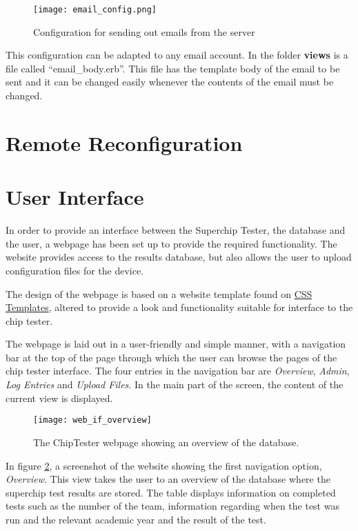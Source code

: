 \begin{figure}[htb]
\centering
\texttt{[image: email\_config.png]}
\caption{Configuration for sending out emails from the server}
\label{fig:email_server}
\end{figure}

This configuration can be adapted to any email account. In the folder {\bf views} is a file called ``email\_body.erb''. This file has the template body of the email to be sent and it can be changed easily whenever the contents of the email must be changed.

\section{Remote Reconfiguration}

\section{User Interface}

In order to provide an interface between the Superchip Tester, the database and the user, a webpage has been set up to provide the required functionality. The website provides access to the results database, but also allows the user to upload configuration files for the device.

The design of the webpage is based on a website template found on \href{http://www.freecsstemplates.org/}{CSS Templates}, altered to provide a look and functionality suitable for interface to the chip tester.

The webpage is laid out in a user-friendly and simple manner, with a navigation bar at the top of the page through which the user can browse the pages of the chip tester interface. The four entries in the navigation bar are \textit{Overview}, \textit{Admin}, \textit{Log Entries} and \textit{Upload Files}. In the main part of the screen, the content of the current view is displayed.

\begin{figure}[ht]
 \centering
 \texttt{[image: web\_if\_overview]}
 \caption{The ChipTester webpage showing an overview of the database.}
 \label{fig:web_if_overview}
\end{figure}

In figure \ref{fig:web_if_overview}, a screenshot of the website showing the first navigation option, \textit{Overview}. This view takes the user to an overview of the database where the superchip test results are stored. The table displays information on completed tests such as the number of the team, information regarding when the test was run and the relevant academic year and the result of the test.

